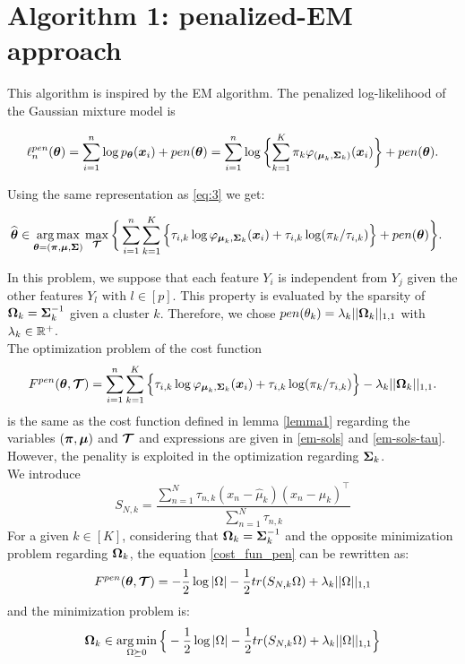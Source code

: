 \section{Algorithm 1: penalized-EM approach}
This algorithm is inspired by the EM algorithm. The penalized log-likelihood of the Gaussian mixture model is

\begin{equation}\label{pen-log-likelihood}
\ell_n^{pen}({\boldsymbol\theta})=\sum_{i=1}^{n}\log{p_{{\boldsymbol\theta}}(\boldsymbol x_i)}+pen({\boldsymbol\theta})=
\sum_{i=1}^{n}\log\bigg\{{\sum_{k=1}^K\pi_k\varphi_{(\boldsymbol\mu_{k},\boldsymbol\Sigma_{k})}(\boldsymbol x_i)}\bigg\} +pen({\boldsymbol\theta}) .
\end{equation}

Using the same representation as \ref{eq:3} we get:

\begin{align}\label{eq:4}
\widehat{{\boldsymbol\theta}}
    &\in\operatorname*{arg\,max}_{{\boldsymbol\theta}=(\boldsymbol \pi,\boldsymbol\mu,\boldsymbol\Sigma)}\max_{\boldsymbol{\mathcal T}}
    \bigg\{\sum_{i=1}^{n} \sum_{k=1}^K \Big\{\tau_{i,k}\log\varphi_{\boldsymbol\mu_{k},\boldsymbol\Sigma_{k}}(\boldsymbol x_i)+\tau_{i,k}
    \log(\pi_k/\tau_{i,k})\Big\}+pen({\boldsymbol\theta})\bigg\}.
\end{align}

In this problem, we suppose that each feature $Y_i$ is independent from $Y_j$ given the other features $Y_l \text{ with } l\in[p]$. This property is evaluated by the sparsity of $\boldsymbol\Omega_k=\boldsymbol\Sigma_k^{-1}$ given a cluster $k$.
Therefore, we chose $pen(\theta_k)=\lambda_k||\boldsymbol\Omega_k||_{1,1}$ with $\lambda_k\in{\mathbb R}^+$.\\

The optimization problem of the cost function
\begin{equation}
\label{cost_fun_pen}
F^{pen}({\boldsymbol\theta},\boldsymbol{\mathcal T})  = \sum_{i=1}^{n} \sum_{k=1}^K \Big\{\tau_{i,k}\log\varphi_{\boldsymbol\mu_{k},\boldsymbol\Sigma_{k}}(\boldsymbol x_i)+\tau_{i,k}
    \log(\pi_k/\tau_{i,k})\Big\}-\lambda_k||\boldsymbol\Omega_k||_{1,1}.
\end{equation}
is the same as the cost function defined in lemma \ref{lemma1} regarding the variables $(\boldsymbol \pi,\boldsymbol\mu)$ and $\boldsymbol{\mathcal T}$ and expressions are given in \ref{em-sols} and \ref{em-sols-tau}. However, the penality is exploited in the optimization regarding $\boldsymbol\Sigma_k$.\\

We introduce
\begin{equation}
    S_{N,k}=\frac{\sum_{n=1}^N\tau_{n,k}(x_n-\hat\mu_k)(x_n-\hat\mu_k)^\top}{\sum_{n=1}^N\tau_{n,k}}
\end{equation}
For a given $k\in[K]$, considering that $\boldsymbol\Omega_k=\boldsymbol\Sigma_k^{-1}$ and the opposite minimization problem regarding $\boldsymbol\Omega_k$, the  equation \ref{cost_fun_pen} can be rewritten as:
\begin{equation}
    F^{pen}({\boldsymbol\theta},\boldsymbol{\mathcal T})  = -\frac{1}{2}\log| \Omega |-\frac{1}{2} tr(S_{N,k}\Omega)+\lambda_k||\Omega||_{1,1}
\end{equation}
and the minimization problem is:
\begin{equation}
    \boldsymbol\Omega_k \in \operatorname*{arg\,min}_{ \Omega\succeq 0} \Big\{ -\frac{1}{2}\log| \Omega |-\frac{1}{2} tr(S_{N,k}\Omega)+\lambda_k||\Omega||_{1,1}\Big\}
\end{equation}


